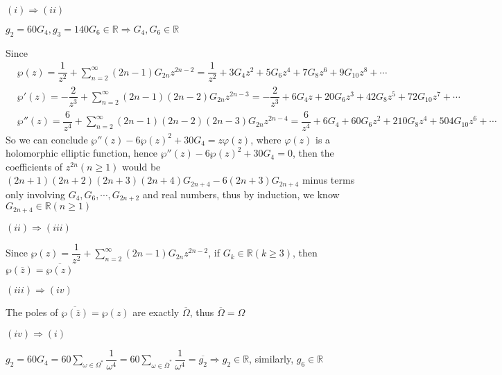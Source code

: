 \documentclass[../main.tex]{subfiles}
\begin{document}
\begin{problem}
$(i)\Rightarrow(ii)$ \par
$g_2=60G_4,g_3=140G_6\in\mathbb{R}\Rightarrow G_4,G_6\in\mathbb{R}$ \par
Since
\[
\begin{aligned}
&\wp(z)=\dfrac{1}{z^2}+\sum_{n=2}^{\infty}(2n-1)G_{2n}z^{2n-2}=\dfrac{1}{z^2}+3G_4z^2+5G_6z^4+7G_8z^6+9G_{10}z^8+\cdots \\
&\wp'(z)=-\dfrac{2}{z^3}+\sum_{n=2}^{\infty}(2n-1)(2n-2)G_{2n}z^{2n-3}=-\dfrac{2}{z^3}+6G_4z+20G_6z^3+42G_8z^5+72G_{10}z^7+\cdots \\
&\wp''(z)=\dfrac{6}{z^4}+\sum_{n=2}^{\infty}(2n-1)(2n-2)(2n-3)G_{2n}z^{2n-4}=\dfrac{6}{z^4}+6G_4+60G_6z^2+210G_8z^4+504G_{10}z^6+\cdots
\end{aligned}
\]
So we can conclude $\wp''(z)-6\wp(z)^2+30G_4=z\varphi(z)$, where $\varphi(z)$ is a holomorphic elliptic function, hence $\wp''(z)-6\wp(z)^2+30G_4=0$, then the coefficients of $z^{2n}(n\geq 1)$ would be $(2n+1)(2n+2)(2n+3)(2n+4)G_{2n+4}-6(2n+3)G_{2n+4}$ minus terms only involving $G_4,G_6,\cdots,G_{2n+2}$ and real numbers, thus by induction, we know $G_{2n+4}\in\mathbb{R}(n\geq 1)$ \par
$(ii)\Rightarrow(iii)$ \par
Since $\wp(z)=\dfrac{1}{z^2}+\sum_{n=2}^{\infty}(2n-1)G_{2n}z^{2n-2}$, if $G_k\in\mathbb{R}(k\geq 3)$, then $\wp(\bar{z})=\overline{\wp(z)}$ \par
$(iii)\Rightarrow(iv)$ \par
The poles of $\overline{\wp(\bar{z})}=\wp(z)$ are exactly $\overline{\Omega}$, thus $\overline{\Omega}=\Omega$ \par
$(iv)\Rightarrow(i)$ \par
$\displaystyle g_2=60G_4=60\sum_{\omega\in\Omega^*}\dfrac{1}{\omega^4}=60\sum_{\omega\in\overline{\Omega}^*}\dfrac{1}{\omega^4}=\overline{g_2}\Rightarrow g_2\in\mathbb{R}$, similarly, $g_6\in\mathbb{R}$
\end{problem}
\end{document}
